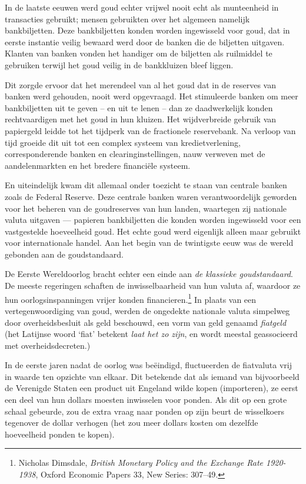 \documentclass[
  a5paper,
  smalldemyvopaper,11pt,twoside,onecolumn,openright,extrafontsizes,
hidelinks]{memoir}
\begin{document}
In de laatste eeuwen werd goud echter vrijwel nooit echt als munteenheid
in transacties gebruikt; mensen gebruikten over het algemeen namelijk
bankbiljetten. Deze bankbiljetten konden worden ingewisseld voor goud,
dat in eerste instantie veilig bewaard werd door de banken die de
biljetten uitgaven. Klanten van banken vonden het handiger om de
biljetten als ruilmiddel te gebruiken terwijl het goud veilig in de
bankkluizen bleef liggen.

Dit zorgde ervoor dat het merendeel van al het goud dat in de reserves
van banken werd gehouden, nooit werd opgevraagd. Het stimuleerde banken
om meer bankbiljetten uit te geven -- en uit te lenen -- dan ze
daadwerkelijk konden rechtvaardigen met het goud in hun kluizen. Het
wijdverbreide gebruik van papiergeld leidde tot het tijdperk van de
fractionele reservebank. Na verloop van tijd groeide dit uit tot een
complex systeem van kredietverlening, corresponderende banken en
clearinginstellingen, nauw verweven met de aandelenmarkten en het
bredere financiële systeem.

En uiteindelijk kwam dit allemaal onder toezicht te staan van centrale
banken zoals de Federal Reserve. Deze centrale banken waren
verantwoordelijk geworden voor het beheren van de goudreserves van hun
landen, waartegen zij nationale valuta uitgaven --- papieren
bankbiljetten die konden worden ingewisseld voor een vastgestelde
hoeveelheid goud. Het echte goud werd eigenlijk alleen maar gebruikt
voor internationale handel. Aan het begin van de twintigste eeuw was de
wereld gebonden aan de goudstandaard.

De Eerste Wereldoorlog bracht echter een einde aan \emph{de klassieke
goudstandaard}. De meeste regeringen schaften de inwisselbaarheid van
hun valuta af, waardoor ze hun oorlogsinspanningen vrijer konden
financieren.\footnote{\hspace{0pt}Nicholas Dimsdale, \emph{British
  Monetary Policy and the Exchange Rate 1920-1938}, Oxford Economic
  Papers 33, New Series: 307--49.} In plaats van een vertegenwoordiging
van goud, werden de ongedekte nationale valuta simpelweg door
overheidsbesluit als geld beschouwd, een vorm van geld genaamd
\emph{fiatgeld} (het Latijnse woord `fiat' betekent \emph{laat het zo
zijn}, en wordt meestal geassocieerd met overheidsdecreten.)

In de eerste jaren nadat de oorlog was beëindigd, fluctueerden de
fiatvaluta vrij in waarde ten opzichte van elkaar. Dit betekende dat als
iemand van bijvoorbeeld de Verenigde Staten een product uit Engeland
wilde kopen (importeren), ze eerst een deel van hun dollars moesten
inwisselen voor ponden. Als dit op een grote schaal gebeurde, zou de
extra vraag naar ponden op zijn beurt de wisselkoers tegenover de dollar
verhogen (het zou meer dollars kosten om dezelfde hoeveelheid ponden te
kopen).
\end{document}
